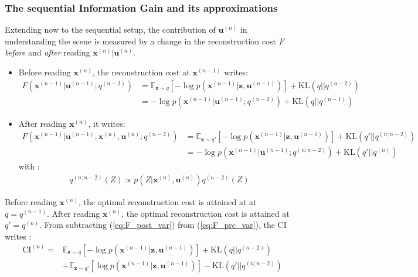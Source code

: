 \documentclass[12pt,twoside,openright]{article}
\begin{document}
\subsubsection{The sequential Information Gain and its approximations}

Extending now to the sequential setup, the contribution of $\boldsymbol{u}^{(n)}$ in understanding the scene is measured by a change in the reconstruction cost $F$ \emph{before} and \emph{after} reading $\boldsymbol{x}^{(n)}|\boldsymbol{u}^{(n)}$.
\begin{itemize}
	\item Before reading $\boldsymbol{x}^{(n)}$, the reconstruction cost at $\boldsymbol{x}^{(n-1)}$ writes:
	\begin{align}
		F(\boldsymbol{x}^{(n-1)}|\boldsymbol{u}^{(n-1)}; q^{(n-2)}) 
		&= \mathbb{E}_{\boldsymbol{z} \sim q} \left[-\log p(\boldsymbol{x}^{(n-1)}| \boldsymbol{z}, \boldsymbol{u}^{(n-1)} )
		\right] + \text{KL}(q||q^{(n-2)}) \label{eq:F_pre_var}\\
		&= -\log p(\boldsymbol{x}^{(n-1)}|\boldsymbol{u}^{(n-1)}; q^{(n-2)}) + \text{KL} (q||q^{(n-1)})\label{eq:F_pre_KL}
	\end{align}
	\item After  reading $\boldsymbol{x}^{(n)}$, it writes:
	\begin{align}
		F(\boldsymbol{x}^{(n-1)}|\boldsymbol{u}^{(n-1)},\boldsymbol{x}^{(n)},\boldsymbol{u}^{(n)}; q^{(n-2)}) 
		&= \mathbb{E}_{\boldsymbol{z} \sim q'} \left[-\log p(\boldsymbol{x}^{(n-1)}| \boldsymbol{z}, \boldsymbol{u}^{(n-1)} )
		\right] + \text{KL}(q'||q^{(n;n-2)}) \label{eq:F_post_var}\\
		&= -\log p(\boldsymbol{x}^{(n-1)}|\boldsymbol{u}^{(n-1)}; q^{(n;n-2)}) + \text{KL} (q'||q^{(n)})\label{eq:F_post_KL}
	\end{align}
	with :
	\begin{align}
		q^{(n; n-2)}(Z) \propto p(Z|\boldsymbol{x}^{(n)}, \boldsymbol{u}^{(n)})q^{(n-2)}(Z)\label{eq:n-n-2}
	\end{align}
\end{itemize}

Before reading $\boldsymbol{x}^{(n)}$, the optimal reconstruction cost is attained at at $q = q^{(n-1)}$. After reading $\boldsymbol{x}^{(n)}$, the optimal reconstruction cost is attained at $q' =  q^{(n)}$. 
From subtracting (\ref{eq:F_post_var}) from (\ref{eq:F_pre_var}), the CI writes :
\begin{align}
	\text{CI}^{(n)}
	=& \mathbb{E}_{\boldsymbol{z} \sim q} \left[-\log p(\boldsymbol{x}^{(n-1)}| \boldsymbol{z}, \boldsymbol{u}^{(n-1)})\right] +
	\text{KL}(q||q^{(n-2)}) \nonumber\\
	& + \mathbb{E}_{\boldsymbol{z} \sim q'} \left[\log p(\boldsymbol{x}^{(n-1)}| \boldsymbol{z}, \boldsymbol{u}^{(n-1)})\right] 
	- \text{KL}(q'|| q^{(n;n-2)})\label{eq:CI}
\end{align}	
\end{document}

